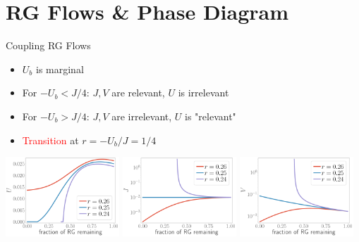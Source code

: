 \documentclass[11pt,aspectratio=169]{beamer}
\newcommand{\focus}[1]{\textcolor{red}{#1}}
\begin{document}
\section{RG Flows \& Phase Diagram}
\begin{frame}{Coupling RG Flows}
\begin{itemize}
\item \(U_b\) is marginal\\[10pt]
\item For \(-U_b < J/4\): \(J,V\) are relevant, \(U\) is irrelevant\\[10pt]
\item For \(-U_b > J/4\): \(J,V\) are irrelevant, \(U\) is "relevant"\\[10pt]
\item \focus{Transition} at \(r = -U_b/J = 1/4\)
\end{itemize}

\vspace*{\fill}

\includegraphics[width=0.32\textwidth]{figures/U_Ub.pdf}
\includegraphics[width=0.32\textwidth]{figures/J_Ub.pdf}
\includegraphics[width=0.32\textwidth]{figures/V_Ub.pdf}

\end{frame}
\end{document}
